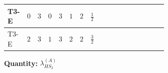 \documentclass[8pt]{article}
\begin{document}
\begin{landscape}
\begin{longtable}{@{}llcccccc >{\raggedright\arraybackslash}p{0.21\linewidth} >{\raggedright\arraybackslash}p{0.21\linewidth} >{\raggedright\arraybackslash}p{0.21\linewidth}@{}}
\midrule
T3-E & $0$ & $3$ & $0$ & $3$ & $1$ & $2$ & $\frac{1}{2}$ & \scriptsize\adjustbox{max width=\linewidth}{$\begin{gathered} {\lambda_{HS_2}^{(A)}} (2 T_{\nu}^{(2)}+6 \operatorname{Tr}\!\left({Y_d}\,\left({Y_d}\right)^{\dagger}\right)+2 \operatorname{Tr}\!\left({Y_e}\,\left({Y_e}\right)^{\dagger}\right)+6 \operatorname{Tr}\!\left({Y_u}\,\left({Y_u}\right)^{\dagger}\right)+16 {\lambda_{S_2}^{(A)}})\end{gathered}$} & \scriptsize\adjustbox{max width=\linewidth}{$\begin{gathered} +\frac{4}{3} \operatorname{Tr}\!\left({y_2}\,\left({y_2}\right)^{\dagger}\,{Y_e}\,\left({Y_e}\right)^{\dagger}\right)\end{gathered}$} & \scriptsize\adjustbox{max width=\linewidth}{$\begin{gathered} -\frac{8}{9} {\lambda_5} \left({\lambda_5}\right)^{*}\end{gathered}$} \\
\midrule
T3-E & $2$ & $3$ & $1$ & $3$ & $2$ & $2$ & $\frac{3}{2}$ & \scriptsize\adjustbox{max width=\linewidth}{$\begin{gathered} {\lambda_{HS_2}^{(A)}} (2 T_{\nu}^{(2)}+6 \operatorname{Tr}\!\left({Y_d}\,\left({Y_d}\right)^{\dagger}\right)+2 \operatorname{Tr}\!\left({Y_e}\,\left({Y_e}\right)^{\dagger}\right)+6 \operatorname{Tr}\!\left({Y_u}\,\left({Y_u}\right)^{\dagger}\right)+16 {\lambda_{S_2}^{(A)}})\end{gathered}$} & \scriptsize\adjustbox{max width=\linewidth}{$\begin{gathered} +\frac{4}{3} \operatorname{Tr}\!\left({y_2}\,\left({y_2}\right)^{\dagger}\,{Y_e}\,\left({Y_e}\right)^{\dagger}\right)\end{gathered}$} & \scriptsize\adjustbox{max width=\linewidth}{$\begin{gathered} -\frac{8}{9} {\lambda_5} \left({\lambda_5}\right)^{*}\end{gathered}$} \\
\midrule
\bottomrule
\end{longtable}
\clearpage
\noindent\textbf{Quantity: }$\lambda_{HS_2}^{(A)}$\par\smallskip

\end{landscape}
\end{document}
